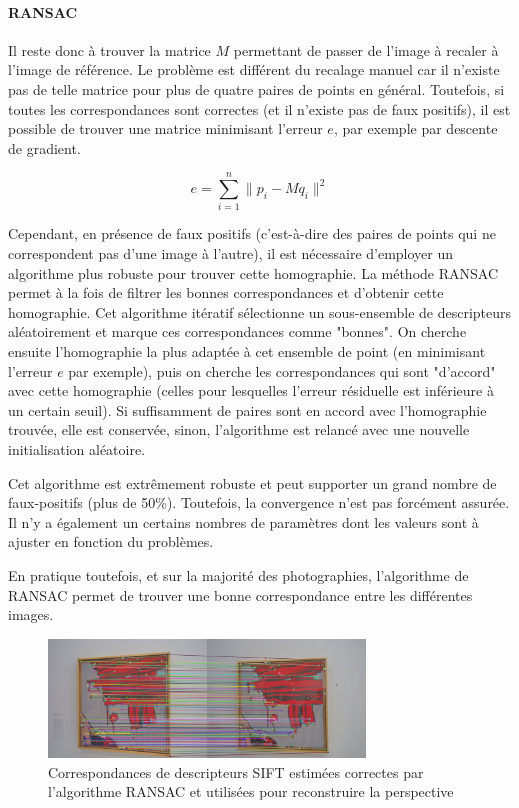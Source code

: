 \documentclass[12pt,a4paper]{article}
\begin{document}
\paragraph{RANSAC}
Il reste donc à trouver la matrice $M$ permettant de passer de l'image à recaler à l'image de référence. Le problème est différent du recalage manuel car il n'existe pas de telle matrice pour plus de quatre paires de points en général. Toutefois, si toutes les correspondances sont correctes (et il n'existe pas de faux positifs), il est possible de trouver une matrice minimisant l'erreur $e$, par exemple par descente de gradient.

$$ e = \sum_{i = 1}^{n}\|p_i - Mq_i\|^2$$

Cependant, en présence de faux positifs (c'est-à-dire des paires de points qui ne correspondent pas d'une image à l'autre), il est nécessaire d'employer un algorithme plus robuste pour trouver cette homographie. La méthode RANSAC~\citep{fischler1981random} permet à la fois de filtrer les bonnes correspondances et d'obtenir cette homographie. Cet algorithme itératif sélectionne un sous-ensemble de descripteurs aléatoirement et marque ces correspondances comme "bonnes". On cherche ensuite l'homographie la plus adaptée à cet ensemble de point (en minimisant l'erreur $e$ par exemple), puis on cherche les correspondances qui sont "d'accord" avec cette homographie (celles pour lesquelles l'erreur résiduelle est inférieure à un certain seuil). Si suffisamment de paires sont en accord avec l'homographie trouvée, elle est conservée, sinon, l'algorithme est relancé avec une nouvelle initialisation aléatoire.

Cet algorithme est extrêmement robuste et peut supporter un grand nombre de faux-positifs (plus de 50\%). Toutefois, la convergence n'est pas forcément assurée. Il n'y a également un certains nombres de paramètres dont les valeurs sont à ajuster en fonction du problèmes.

En pratique toutefois, et sur la majorité des photographies, l'algorithme de RANSAC permet de trouver une bonne correspondance entre les différentes images. 

\begin{figure}[H]
  \centering
  \includegraphics[width=0.75\textwidth]{Fig/sift_ransac.png}
  \caption{Correspondances de descripteurs SIFT estimées correctes par l'algorithme RANSAC et utilisées pour reconstruire la perspective}
\end{figure}
\end{document}
